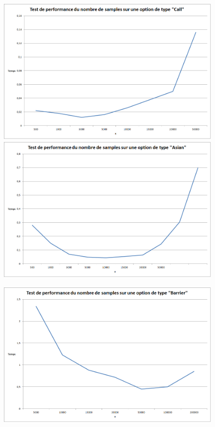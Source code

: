 \documentclass[french,12pt,a4paper]{article}
\begin{document}
\begin{center}
\begin{figure}
   \begin{minipage}[c]{.46\linewidth}
\includegraphics[scale=0.3]{samples_call.png}
   \end{minipage} \hfill
   \begin{minipage}[c]{.46\linewidth}
\includegraphics[scale=0.3]{samples_asian.png}
   \end{minipage}
\end{figure}
\begin{figure}

\includegraphics[scale=0.3]{samples_barrier.png}

\end{figure}
\end{center}
\end{document}
